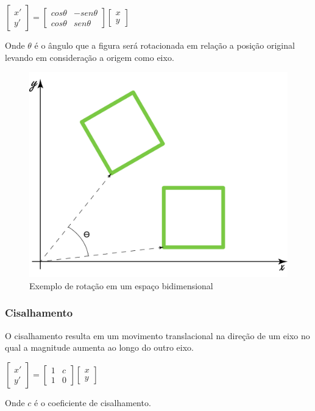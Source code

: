 \documentclass[9pt, a4paper, nofonttune, journal]{IEEEtran}
\begin{document}
\begin{center}
$\begin{bmatrix}x'\\
y'
\end{bmatrix}=\begin{bmatrix}cos\theta & -sen\theta\\
cos\theta & sen\theta
\end{bmatrix}\begin{bmatrix}x\\
y
\end{bmatrix}$\end{center}
Onde $\theta$ é o ângulo que a figura será rotacionada em relação a posição original levando em consideração a origem como eixo. \cite{CGPPBook1}

\begin{figure}[H] 
\begin{center}
\includegraphics[scale=0.25]{figuras/rotation1}
\caption{Exemplo de rotação em um espaço bidimensional}
\end{center}
\end{figure}

\subsubsection{Cisalhamento}
O cisalhamento resulta em um movimento translacional na direção de um eixo no qual a magnitude aumenta ao longo do outro eixo.

\begin{center}
$\begin{bmatrix}x'\\
y'
\end{bmatrix}=\begin{bmatrix}1 & c\\
1 & 0
\end{bmatrix}\begin{bmatrix}x\\
y
\end{bmatrix}$\end{center}
Onde $c$ é o coeficiente de cisalhamento.\cite{CGPPBook1}
\end{document}

